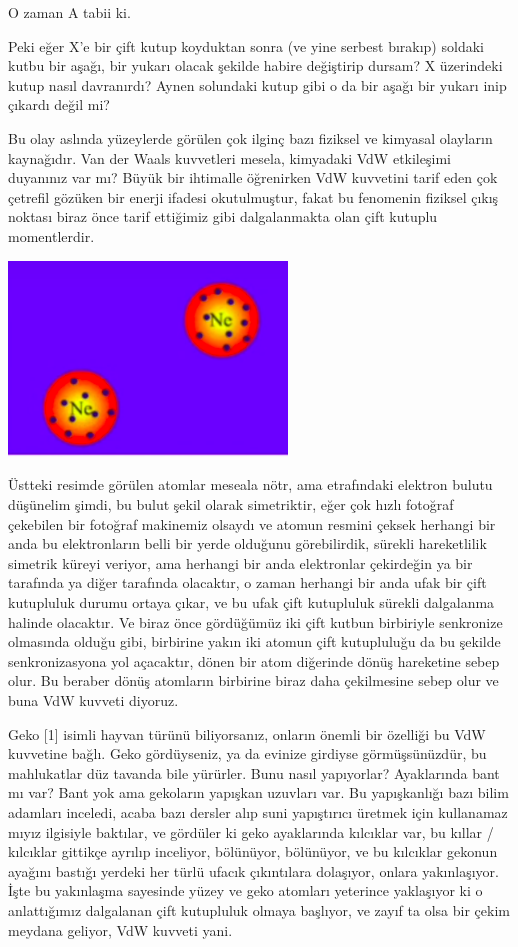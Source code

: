 \documentclass[12pt,fleqn]{article}\usepackage{../../common}
\begin{document}
O zaman A tabii ki.

Peki eğer X'e bir çift kutup koyduktan sonra (ve yine serbest bırakıp) soldaki
kutbu bir aşağı, bir yukarı olacak şekilde habire değiştirip dursam? X
üzerindeki kutup nasıl davranırdı? Aynen solundaki kutup gibi o da bir aşağı bir
yukarı inip çıkardı değil mi?  

Bu olay aslında yüzeylerde görülen çok ilginç bazı fiziksel ve kimyasal
olayların kaynağıdır. Van der Waals kuvvetleri mesela, kimyadaki VdW etkileşimi
duyanınız var mı? Büyük bir ihtimalle öğrenirken VdW kuvvetini tarif eden çok
çetrefil gözüken bir enerji ifadesi okutulmuştur, fakat bu fenomenin fiziksel
çıkış noktası biraz önce tarif ettiğimiz gibi dalgalanmakta olan çift kutuplu
momentlerdir.

\includegraphics[width=20em]{04_05.png}

Üstteki resimde görülen atomlar meseala nötr, ama etrafındaki elektron bulutu
düşünelim şimdi, bu bulut şekil olarak simetriktir, eğer çok hızlı fotoğraf
çekebilen bir fotoğraf makinemiz olsaydı ve atomun resmini çeksek herhangi bir
anda bu elektronların belli bir yerde olduğunu görebilirdik, sürekli
hareketlilik simetrik küreyi veriyor, ama herhangi bir anda elektronlar
çekirdeğin ya bir tarafında ya diğer tarafında olacaktır, o zaman herhangi bir
anda ufak bir çift kutupluluk durumu ortaya çıkar, ve bu ufak çift kutupluluk
sürekli dalgalanma halinde olacaktır. Ve biraz önce gördüğümüz iki çift kutbun
birbiriyle senkronize olmasında olduğu gibi, birbirine yakın iki atomun çift
kutupluluğu da bu şekilde senkronizasyona yol açacaktır, dönen bir atom
diğerinde dönüş hareketine sebep olur. Bu beraber dönüş atomların birbirine
biraz daha çekilmesine sebep olur ve buna VdW kuvveti diyoruz.

Geko [1] isimli hayvan türünü biliyorsanız, onların önemli bir özelliği bu VdW
kuvvetine bağlı. Geko gördüyseniz, ya da evinize girdiyse görmüşsünüzdür, bu
mahlukatlar düz tavanda bile yürürler. Bunu nasıl yapıyorlar? Ayaklarında bant
mı var? Bant yok ama gekoların yapışkan uzuvları var. Bu yapışkanlığı bazı bilim
adamları inceledi, acaba bazı dersler alıp suni yapıştırıcı üretmek için
kullanamaz mıyız ilgisiyle baktılar, ve gördüler ki geko ayaklarında kılcıklar
var, bu kıllar / kılcıklar gittikçe ayrılıp inceliyor, bölünüyor, bölünüyor, ve
bu kılcıklar gekonun ayağını bastığı yerdeki her türlü ufacık çıkıntılara
dolaşıyor, onlara yakınlaşıyor. İşte bu yakınlaşma sayesinde yüzey ve geko
atomları yeterince yaklaşıyor ki o anlattığımız dalgalanan çift kutupluluk
olmaya başlıyor, ve zayıf ta olsa bir çekim meydana geliyor, VdW kuvveti yani.
\end{document}
